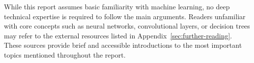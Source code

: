 While this report assumes basic familiarity with machine learning, no deep technical expertise is required to follow the main arguments. Readers unfamiliar with core concepts such 
as neural networks, convolutional layers, or decision trees may refer to the external resources listed in Appendix~\ref{sec:further-reading}. 
These sources provide brief and accessible introductions to the most important topics mentioned throughout the report.